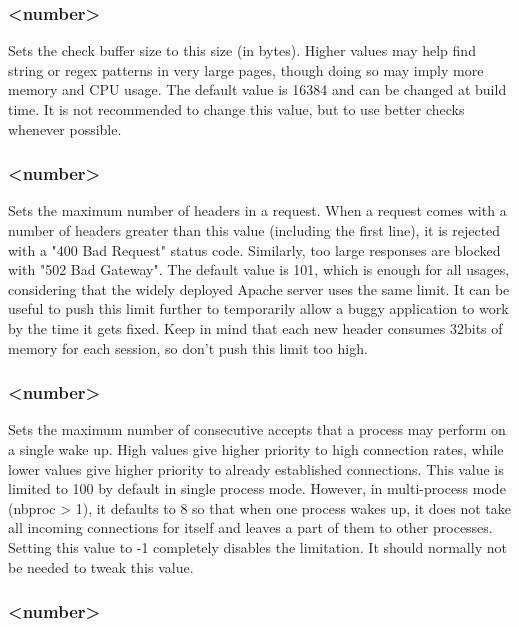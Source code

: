 \subsubsection[tune.chksize]{ <number>}

Sets the check buffer size to this size (in bytes). Higher values may help
find string or regex patterns in very large pages, though doing so may imply
more memory and CPU usage. The default value is 16384 and can be changed at
build time. It is not recommended to change this value, but to use better
checks whenever possible.

\subsubsection[tune.http.maxhdr]{ <number>}

Sets the maximum number of headers in a request. When a request comes with a
number of headers greater than this value (including the first line), it is
rejected with a "400 Bad Request" status code. Similarly, too large responses
are blocked with "502 Bad Gateway". The default value is 101, which is enough
for all usages, considering that the widely deployed Apache server uses the
same limit. It can be useful to push this limit further to temporarily allow
a buggy application to work by the time it gets fixed. Keep in mind that each
new header consumes 32bits of memory for each session, so don't push this
limit too high.

\subsubsection[tune.maxaccept]{ <number>}

Sets the maximum number of consecutive accepts that a process may perform on
a single wake up. High values give higher priority to high connection rates,
while lower values give higher priority to already established connections.
This value is limited to 100 by default in single process mode. However, in
multi-process mode (nbproc > 1), it defaults to 8 so that when one process
wakes up, it does not take all incoming connections for itself and leaves a
part of them to other processes. Setting this value to -1 completely disables
the limitation. It should normally not be needed to tweak this value.

\subsubsection[tune.maxpollevents]{ <number>}


